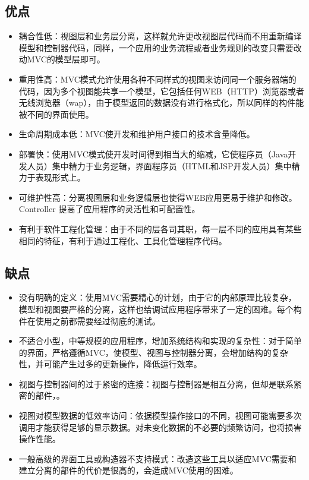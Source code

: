 \documentclass[a4paper,12pt]{ctexart}
\begin{document}
	\subsection{优点}
	\begin{itemize}
		\item 耦合性低：视图层和业务层分离，这样就允许更改视图层代码而不用重新编译模型和控制器代码，同样，一个应用的业务流程或者业务规则的改变只需要改动MVC的模型层即可。
		\item 重用性高：MVC模式允许使用各种不同样式的视图来访问同一个服务器端的代码，因为多个视图能共享一个模型，它包括任何WEB（HTTP）浏览器或者无线浏览器（wap），由于模型返回的数据没有进行格式化，所以同样的构件能被不同的界面使用。
		\item 生命周期成本低：MVC使开发和维护用户接口的技术含量降低。
		\item 部署快：使用MVC模式使开发时间得到相当大的缩减，它使程序员（Java开发人员）集中精力于业务逻辑，界面程序员（HTML和JSP开发人员）集中精力于表现形式上。
		\item 可维护性高：分离视图层和业务逻辑层也使得WEB应用更易于维护和修改。Controller 提高了应用程序的灵活性和可配置性。
		\item 有利于软件工程化管理：由于不同的层各司其职，每一层不同的应用具有某些相同的特征，有利于通过工程化、工具化管理程序代码。
	\end{itemize}
	\subsection{缺点}
	\begin{itemize}
		\item 没有明确的定义：使用MVC需要精心的计划，由于它的内部原理比较复杂，模型和视图要严格的分离，这样也给调试应用程序带来了一定的困难。每个构件在使用之前都需要经过彻底的测试。
		\item 不适合小型，中等规模的应用程序，增加系统结构和实现的复杂性：对于简单的界面，严格遵循MVC，使模型、视图与控制器分离，会增加结构的复杂性，并可能产生过多的更新操作，降低运行效率。
		\item 视图与控制器间的过于紧密的连接：视图与控制器是相互分离，但却是联系紧密的部件，。
		\item 视图对模型数据的低效率访问：依据模型操作接口的不同，视图可能需要多次调用才能获得足够的显示数据。对未变化数据的不必要的频繁访问，也将损害操作性能。
		\item 一般高级的界面工具或构造器不支持模式：改造这些工具以适应MVC需要和建立分离的部件的代价是很高的，会造成MVC使用的困难。
	\end{itemize}
\end{document}
